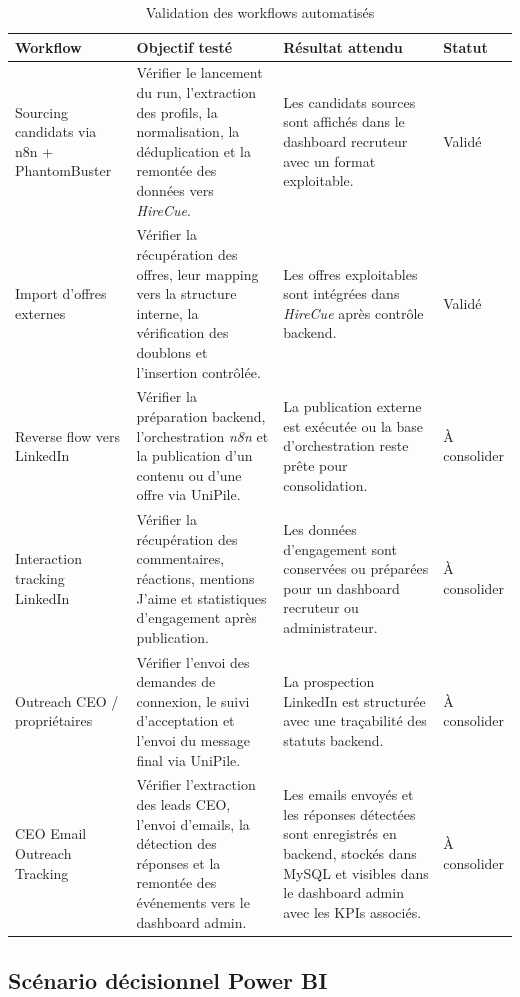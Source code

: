 \begin{table}[H]
\centering
\small
\renewcommand{\arraystretch}{1.3}
\begin{tabular}{|p{3cm}|p{5.1cm}|p{4.2cm}|p{1.6cm}|}
\hline
\rowcolor{headerblue}
\textbf{Workflow} & \textbf{Objectif testé} & \textbf{Résultat attendu} & \textbf{Statut} \\
\hline
Sourcing candidats via n8n + PhantomBuster & Vérifier le lancement du run, l'extraction des profils, la normalisation, la déduplication et la remontée des données vers \textit{HireCue}. & Les candidats sources sont affichés dans le dashboard recruteur avec un format exploitable. & Validé \\
\hline
Import d'offres externes & Vérifier la récupération des offres, leur mapping vers la structure interne, la vérification des doublons et l'insertion contrôlée. & Les offres exploitables sont intégrées dans \textit{HireCue} après contrôle backend. & Validé \\
\hline
Reverse flow vers LinkedIn & Vérifier la préparation backend, l'orchestration \textit{n8n} et la publication d'un contenu ou d'une offre via UniPile. & La publication externe est exécutée ou la base d'orchestration reste prête pour consolidation. & À consolider \\
\hline
Interaction tracking LinkedIn & Vérifier la récupération des commentaires, réactions, mentions J'aime et statistiques d'engagement après publication. & Les données d'engagement sont conservées ou préparées pour un dashboard recruteur ou administrateur. & À consolider \\
\hline
Outreach CEO / propriétaires & Vérifier l'envoi des demandes de connexion, le suivi d'acceptation et l'envoi du message final via UniPile. & La prospection LinkedIn est structurée avec une traçabilité des statuts backend. & À consolider \\
\hline
CEO Email Outreach Tracking & Vérifier l'extraction des leads CEO, l'envoi d'emails, la détection des réponses et la remontée des événements vers le dashboard admin. & Les emails envoyés et les réponses détectées sont enregistrés en backend, stockés dans MySQL et visibles dans le dashboard admin avec les KPIs associés. & À consolider \\
\hline
\end{tabular}
\normalsize
\caption{Validation des workflows automatisés}
\end{table}

\subsection{Scénario décisionnel Power BI}

